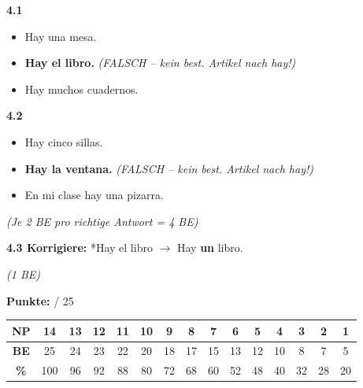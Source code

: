 \documentclass[11pt,a4paper]{article}
\newcommand{\luecke}[1]{\underline{\hspace{#1}}}
\newcommand{\lsg}[1]{\textcolor{loesung}{\textbf{#1}}}
\newcommand{\kreisVoll}{\textcolor{loesung}{$\CIRCLE$}}
\begin{document}
\vspace{0.3cm}

\textbf{4.1}
\begin{itemize}[label=$\bigcirc$, nosep]
    \item Hay una mesa.
    \item[\kreisVoll] \lsg{Hay el libro.} \textcolor{loesung}{\textit{(FALSCH -- kein best. Artikel nach hay!)}}
    \item Hay muchos cuadernos.
\end{itemize}

\vspace{0.3cm}

\textbf{4.2}
\begin{itemize}[label=$\bigcirc$, nosep]
    \item Hay cinco sillas.
    \item[\kreisVoll] \lsg{Hay la ventana.} \textcolor{loesung}{\textit{(FALSCH -- kein best. Artikel nach hay!)}}
    \item En mi clase hay una pizarra.
\end{itemize}

\textcolor{loesung}{\textit{(Je 2 BE pro richtige Antwort = 4 BE)}}

\vspace{0.5cm}

\noindent\textbf{4.3 Korrigiere:} *Hay el libro $\rightarrow$ Hay \lsg{un} libro.

\textcolor{loesung}{\textit{(1 BE)}}

\vspace{1cm}

\begin{flushright}
\textbf{Punkte:} \luecke{1cm} / 25
\end{flushright}

\vspace{0.5cm}

\begin{tcolorbox}[colback=white, colframe=grau, title=\textbf{Bewertung (14-NP-Skala)}]
\begin{center}
\small
\begin{tabular}{|c|c|c|c|c|c|c|c|c|c|c|c|c|c|c|}
\hline
\textbf{NP} & 14 & 13 & 12 & 11 & 10 & 9 & 8 & 7 & 6 & 5 & 4 & 3 & 2 & 1 \\
\hline
\textbf{BE} & 25 & 24 & 23 & 22 & 20 & 18 & 17 & 15 & 13 & 12 & 10 & 8 & 7 & 5 \\
\hline
\textbf{\%} & 100 & 96 & 92 & 88 & 80 & 72 & 68 & 60 & 52 & 48 & 40 & 32 & 28 & 20 \\
\hline
\end{tabular}
\end{center}
\end{tcolorbox}
\end{document}
